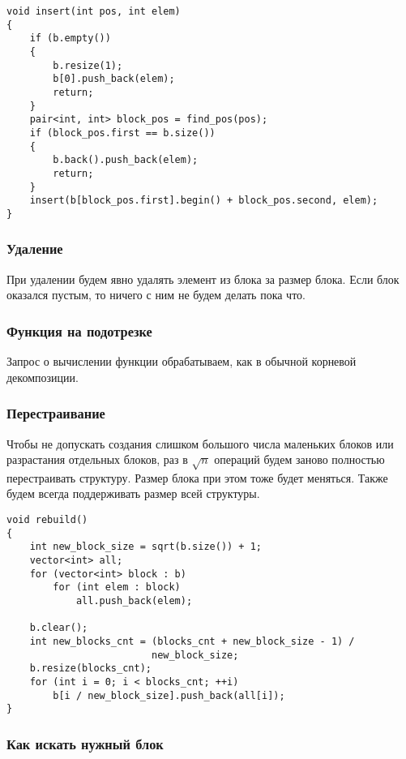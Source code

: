 \begin{verbatim}
void insert(int pos, int elem)
{
    if (b.empty())
    {
        b.resize(1);
        b[0].push_back(elem);
        return;
    }
    pair<int, int> block_pos = find_pos(pos);
    if (block_pos.first == b.size())
    {
        b.back().push_back(elem);
        return;
    }
    insert(b[block_pos.first].begin() + block_pos.second, elem);
}
\end{verbatim}

\subsubsection{Удаление}

При удалении будем явно удалять элемент из блока за размер блока. Если блок оказался пустым, то ничего с ним не будем делать пока что.

\subsubsection{Функция на подотрезке}

Запрос о вычислении функции обрабатываем, как в обычной корневой декомпозиции.

\subsubsection{Перестраивание}

Чтобы не допускать создания слишком большого числа маленьких блоков или разрастания отдельных блоков, раз в $\sqrt{n}$ операций будем заново полностью перестраивать структуру. Размер блока при этом тоже будет меняться. Также будем всегда поддерживать размер всей структуры.

\begin{verbatim}
void rebuild()
{
    int new_block_size = sqrt(b.size()) + 1;
    vector<int> all;
    for (vector<int> block : b)
        for (int elem : block)
            all.push_back(elem);

    b.clear();
    int new_blocks_cnt = (blocks_cnt + new_block_size - 1) /
                         new_block_size;
    b.resize(blocks_cnt);
    for (int i = 0; i < blocks_cnt; ++i)
        b[i / new_block_size].push_back(all[i]);
}
\end{verbatim}

\subsubsection{Как искать нужный блок}

